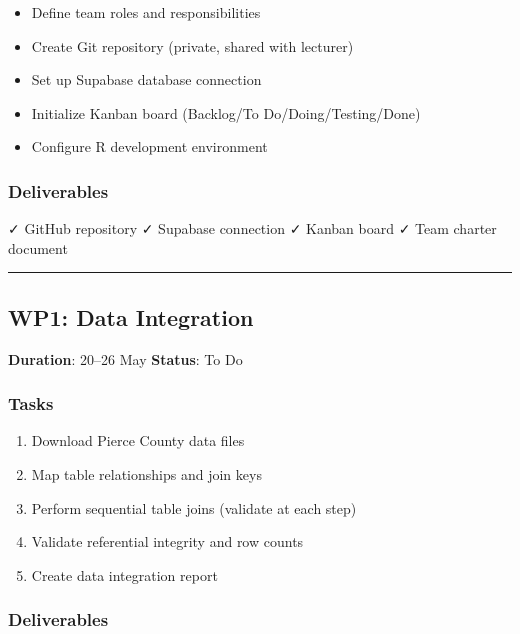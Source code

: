 \documentclass[
  english,
  letterpaper,
  DIV=11,
  numbers=noendperiod]{scrreprt}
\providecommand{\tightlist}{%
  \setlength{\itemsep}{0pt}\setlength{\parskip}{0pt}}
\begin{document}
\begin{itemize}
\tightlist
\item
  Define team roles and responsibilities
\item
  Create Git repository (private, shared with lecturer)
\item
  Set up Supabase database connection
\item
  Initialize Kanban board (Backlog/To Do/Doing/Testing/Done)
\item
  Configure R development environment
\end{itemize}

\subsubsection{Deliverables}\label{deliverables}

✓ GitHub repository ✓ Supabase connection ✓ Kanban board ✓ Team charter
document

\begin{center}\rule{0.5\linewidth}{0.5pt}\end{center}

\subsection{WP1: Data Integration}\label{wp1-data-integration}

\textbf{Duration}: 20--26 May \textbar{} \textbf{Status}: To Do

\subsubsection{Tasks}\label{tasks-1}

\begin{enumerate}
\def\labelenumi{\arabic{enumi}.}
\tightlist
\item
  Download Pierce County data files
\item
  Map table relationships and join keys
\item
  Perform sequential table joins (validate at each step)
\item
  Validate referential integrity and row counts
\item
  Create data integration report
\end{enumerate}

\subsubsection{Deliverables}\label{deliverables-1}
\end{document}
